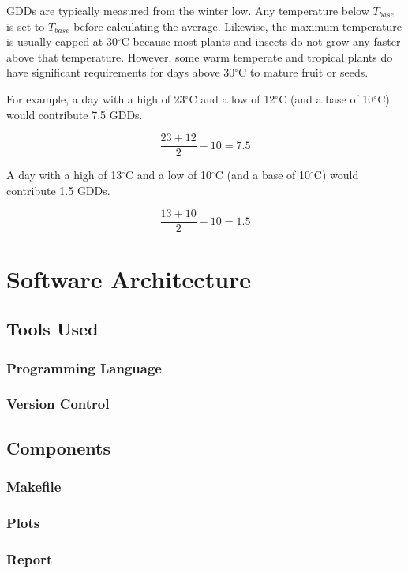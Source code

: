 \documentclass{article}
\begin{document}
GDDs are typically measured from the winter low. Any temperature below $T_{base}$ is set to $T_{base}$ before calculating the average. Likewise, the maximum temperature is usually capped at 30$^{\circ}$C because most plants and insects do not grow any faster above that temperature. However, some warm temperate and tropical plants do have significant requirements for days above 30$^{\circ}$C to mature fruit or seeds.\vspace{5mm}

For example, a day with a high of 23$^{\circ}$C and a low of 12$^{\circ}$C (and a base of 10$^{\circ}$C) would contribute 7.5 GDDs.\vspace{5mm}

\[ \frac {23+12}{2}-10=7.5 \] \par

A day with a high of 13$^{\circ}$C and a low of 10$^{\circ}$C (and a base of 10$^{\circ}$C) would contribute 1.5 GDDs.\vspace{5mm}

\[ \frac {13+10}{2}-10=1.5 \] \par

\noindent
\section{ \bf Software Architecture}
\subsection{Tools Used}
\subsubsection{Programming Language}
\subsubsection{Version Control}
\subsection{Components}
\subsubsection{Makefile}
\subsubsection{Plots}
\subsubsection{Report}
\end{document}
